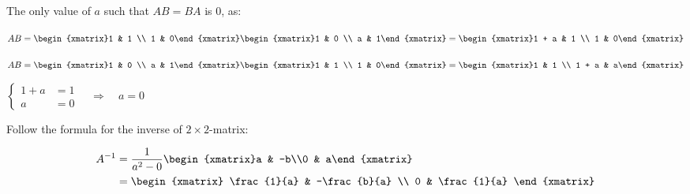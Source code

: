 
\begin{exercise}{8}
  The only value of $a$ such that $AB = BA$ is $0$, as:
  \medskip

  $AB = \begin{xmatrix}1 & 1 \\ 1 & 0\end{xmatrix}
        \begin{xmatrix}1 & 0 \\ a & 1\end{xmatrix}
      = \begin{xmatrix}1 + a & 1 \\ 1 & 0\end{xmatrix}$
  \medskip

  $AB = \begin{xmatrix}1 & 0 \\ a & 1\end{xmatrix}
        \begin{xmatrix}1 & 1 \\ 1 & 0\end{xmatrix}
      = \begin{xmatrix}1 & 1 \\ 1 + a & a\end{xmatrix}$
  \medskip

  $\left\{
    \begin{aligned}
      1 + a &= 1 \\
          a &= 0
    \end{aligned}
  \right.\quad \Longrightarrow \quad a = 0$
\end{exercise}

\begin{exercise}{10}
  Follow the formula for the inverse of $2\times2$-matrix:

  \begin{align*}
    A^{-1} &= \frac{1}{a^2-0}\begin{xmatrix}a & -b\\0 & a\end{xmatrix} \\
           &= \begin{xmatrix}
                \frac{1}{a} & -\frac{b}{a} \\
                          0 &  \frac{1}{a}
              \end{xmatrix}
  \end{align*}
\end{exercise}

